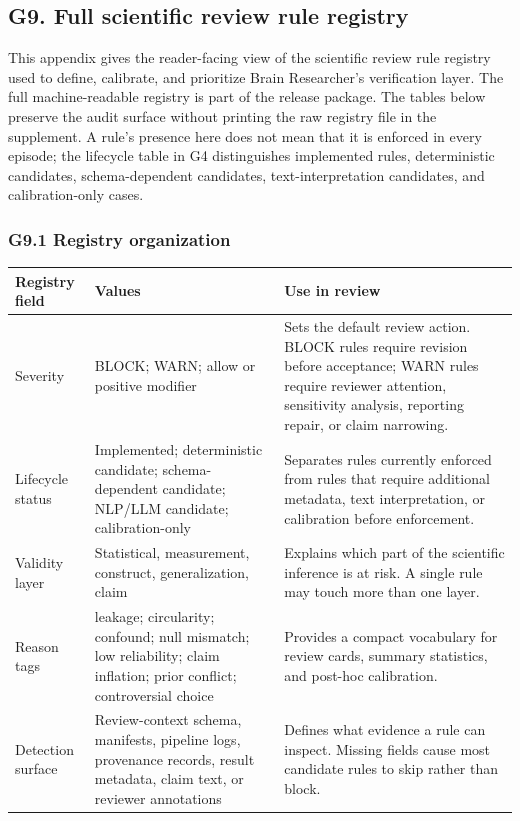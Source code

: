 \subsection{\texorpdfstring{\textbf{G9. Full scientific review rule registry}}{G9. Full scientific review rule registry}}\label{g9.-full-scientific-review-rule-registry}

This appendix gives the reader-facing view of the scientific review rule registry used to define, calibrate, and prioritize Brain Researcher's verification layer. The full machine-readable registry is part of the release package. The tables below preserve the audit surface without printing the raw registry file in the supplement. A rule's presence here does not mean that it is enforced in every episode; the lifecycle table in G4 distinguishes implemented rules, deterministic candidates, schema-dependent candidates, text-interpretation candidates, and calibration-only cases.

\subsubsection{\texorpdfstring{\textbf{G9.1 Registry organization}}{G9.1 Registry organization}}

\begin{longtable}{|>{\RaggedRight\hspace{0pt}\arraybackslash}p{}|>{\RaggedRight\hspace{0pt}\arraybackslash}p{}|>{\RaggedRight\hspace{0pt}\arraybackslash}p{}|}
\hline
\rowcolor{brtablehead}\textbf{Registry field} & \textbf{Values} & \textbf{Use in review} \\
\hline
Severity & BLOCK; WARN; allow or positive modifier & Sets the default review action. BLOCK rules require revision before acceptance; WARN rules require reviewer attention, sensitivity analysis, reporting repair, or claim narrowing. \\
\hline
Lifecycle status & Implemented; deterministic candidate; schema-dependent candidate; NLP/LLM candidate; calibration-only & Separates rules currently enforced from rules that require additional metadata, text interpretation, or calibration before enforcement. \\
\hline
Validity layer & Statistical, measurement, construct, generalization, claim & Explains which part of the scientific inference is at risk. A single rule may touch more than one layer. \\
\hline
Reason tags & leakage; circularity; confound; null mismatch; low reliability; claim inflation; prior conflict; controversial choice & Provides a compact vocabulary for review cards, summary statistics, and post-hoc calibration. \\
\hline
Detection surface & Review-context schema, manifests, pipeline logs, provenance records, result metadata, claim text, or reviewer annotations & Defines what evidence a rule can inspect. Missing fields cause most candidate rules to skip rather than block. \\
\hline
\end{longtable}

